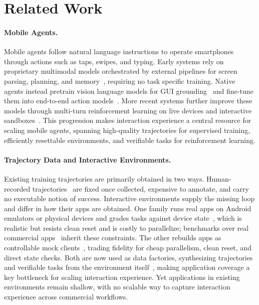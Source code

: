 
\section{Related Work}
\label{sec:related}

\paragraph{Mobile Agents.} 
Mobile agents follow natural language instructions to operate smartphones through actions such as taps, swipes, and typing.
Early systems rely on proprietary multimodal models orchestrated by external pipelines for screen parsing, planning, and memory~\citep{wang2024mobile, zhang2025appagent, yang2026symphony, sun2026sentinel}, requiring no task specific training.
Native agents instead pretrain vision language models for GUI grounding~\citep{cheng2024seeclick, hong2024cogagent, wu2025atlas} and fine-tune them into end-to-end action models~\citep{qin2025ui, liu2024autoglm, ye2025mobile}.
More recent systems further improve these models through multi-turn reinforcement learning on live devices and interactive sandboxes~\citep{wang2025ui, zhou2025mai, team2026ui, xu2026mobile, gao2026ui}.
This progression makes interaction experience a central resource for scaling mobile agents, spanning high-quality trajectories for supervised training, efficiently resettable environments, and verifiable tasks for reinforcement learning.

\paragraph{Trajectory Data and Interactive Environments.}

Existing training trajectories are primarily obtained in two ways. Human-recorded trajectories~\citep{rawles2023androidinthewild, li2024effects, zhang2024android, lu2025guiodyssey} are fixed once collected, expensive to annotate, and carry no executable notion of success. Interactive environments supply the missing loop and differ in how their apps are obtained. One family runs real apps on Android emulators or physical devices and grades tasks against device state~\citep{rawles2025androidworld, xu2025androidlab, chai2026a3, chen2024spa}, which is realistic but resists clean reset and is costly to parallelize; benchmarks over real commercial apps~\citep{wu2026mobilebench, feng2026mobiflow, sui2026androiddaily} inherit these constraints. The other rebuilds apps as controllable mock clients~\citep{trivedi2024appworld, wu2026mobilegym, liu2026phoneworld}, trading fidelity for cheap parallelism, clean reset, and direct state checks. Both are now used as data factories, synthesizing trajectories and verifiable tasks from the environment itself~\citep{sun2025genesis, cheng2026openmobile, liu2026scalewob, cao2026gui, team2026hymobileagent}, making application coverage a key bottleneck for scaling interaction experience.
Yet applications in existing environments remain shallow, with no scalable way to capture interaction experience across commercial workflows.

